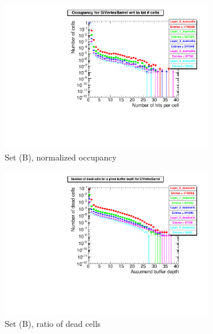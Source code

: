   \begin{figure}[htb]\ContinuedFloat
     \begin{subfigure}[b]{0.49\textwidth}
   \centering
    \includegraphics[width=\textwidth]{Figures/Pairs/Appendix/occupancy_numcells_SiVertexBarrel_ILC250_SetB_corrected_Barrel_size.pdf}
   \caption{Set (B), normalized occupancy}
   \end{subfigure}
   \hfill
    \begin{subfigure}[b]{0.49\textwidth}
   \centering
    \includegraphics[width=\textwidth]{Figures/Pairs/Appendix/occupancy_deadcells_SiVertexBarrel_ILC250_SetB_corrected_Barrel_size.pdf}
    \caption{Set (B), ratio of dead cells}
   \end{subfigure}\\
     \begin{subfigure}[b]{0.49\textwidth}

\end{subfigure}
\end{figure}
